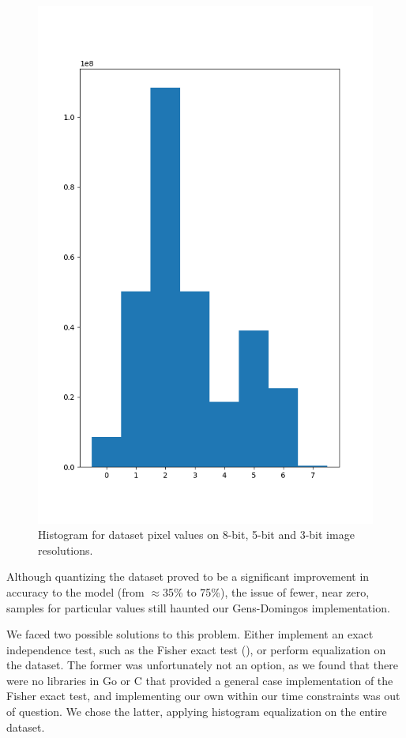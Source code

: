 \begin{figure}[h]
  \includegraphics[scale=0.3]{imgs/hist_3.png}
  \caption{Histogram for dataset pixel values on 8-bit, 5-bit and 3-bit image
    resolutions.\label{fig:hist-orig}}
\end{figure}

Although quantizing the dataset proved to be a significant improvement in accuracy to the model
(from $\approx$35\% to 75\%), the issue of fewer, near zero, samples for particular values still
haunted our Gens-Domingos implementation.

We faced two possible solutions to this problem. Either implement an exact independence test, such
as the Fisher exact test (\cite{fisher-exact}), or perform equalization on the dataset. The former
was unfortunately not an option, as we found that there were no libraries in Go or C that provided
a general case implementation of the Fisher exact test, and implementing our own within our time
constraints was out of question. We chose the latter, applying histogram equalization on the entire
dataset.

